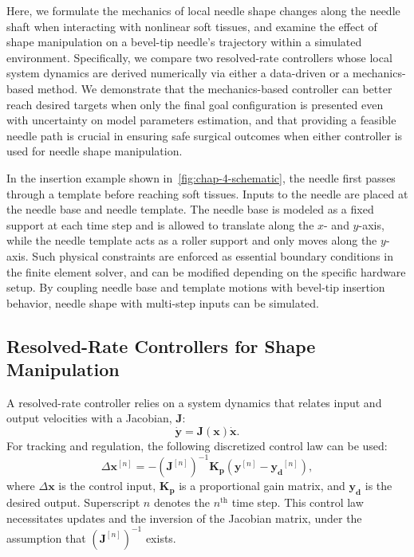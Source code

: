 Here, we formulate the mechanics of local needle shape changes along the needle shaft when interacting with nonlinear soft tissues, and examine the effect of shape manipulation on a bevel-tip needle's trajectory within a simulated environment. Specifically, we compare two resolved-rate controllers whose local system dynamics are derived numerically via either a data-driven or a mechanics-based method. We demonstrate that the mechanics-based controller can better reach desired targets when only the final goal configuration is presented even with uncertainty on model parameters estimation, and that providing a feasible needle path is crucial in ensuring safe surgical outcomes when either controller is used for needle shape manipulation.

In the insertion example shown in~\cref{fig:chap-4-schematic}, the needle first passes through a template before reaching soft tissues. Inputs to the needle are placed at the needle base and needle template. The needle base is modeled as a fixed support at each time step and is allowed to translate along the $x$- and $y$-axis, while the needle template acts as a roller support and only moves along the $y$-axis. Such physical constraints are enforced as essential boundary conditions in the finite element solver, and can be modified depending on the specific hardware setup. By coupling needle base and template motions with bevel-tip insertion behavior, needle shape with multi-step inputs can be simulated.

\subsection{Resolved-Rate Controllers for Shape Manipulation}
\label{sec:chap-4-resolved-rate-controllers}
A resolved-rate controller relies on a system dynamics that relates input and output velocities with a Jacobian, $\mathbf{J}$:
\begin{equation}
\dot{\mathbf{y}} = \mathbf{J}(\mathbf{x})\dot{\mathbf{x}}.\label{eq:chap-4-resolved-rate-dynamics}
\end{equation}
For tracking and regulation, the following discretized control law can be used:
\begin{equation}
  \Delta \mathbf{x}^{[n]} = -\left(\mathbf{J}^{[n]}\right)^{-1}\mathbf{K_p}(\mathbf{y}^{[n]} - \mathbf{y_d}^{[n]}), \label{eq:chap-4-control-law}
\end{equation}
where $\Delta\mathbf{x}$ is the control input, $\mathbf{K_p}$ is a proportional gain matrix, and $\mathbf{y_d}$ is the desired output. Superscript $n$ denotes the $n^\text{th}$ time step. This control law necessitates updates and the inversion of the Jacobian matrix, under the assumption that $\left(\mathbf{J}^{[n]}\right)^{-1}$ exists.

